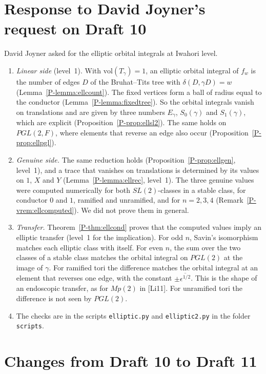 \documentclass[12pt,letterpaper]{amsart}
\begin{document}
\section{Response to David Joyner's request on Draft 10}
\label{sec:d10request}

David Joyner asked for the elliptic orbital integrals at Iwahori level.

\begin{enumerate}[leftmargin=1.5em]
\item \emph{Linear side} (level~1). With $\mathrm{vol}(T_\gamma)=1$, an elliptic
orbital integral of $f_w$ is the number of edges $D$ of the
Bruhat--Tits tree with $\delta(D,\gamma D)=w$
(Lemma~\ref{P-lemma:ellcount}). The fixed vertices form a ball of
radius equal to the conductor (Lemma~\ref{P-lemma:fixedtree}). So the
orbital integrals vanish on translations and are given by three
numbers $E_\gamma$, $S_0(\gamma)$ and $S_1(\gamma)$, which are
explicit (Proposition~\ref{P-prop:ellsl2}). The same holds on
$PGL(2,F)$, where elements that reverse an edge also occur
(Proposition~\ref{P-prop:ellpgl}).
\item \emph{Genuine side.} The same reduction holds
(Proposition~\ref{P-prop:ellgen}, level~1), and a trace that vanishes on
translations is determined by its values on $1$, $X$ and $Y$
(Lemma~\ref{P-lemma:ellrec}, level~1). The three genuine values were
computed numerically for both $SL(2)$-classes in a stable class, for
conductor $0$ and $1$, ramified and unramified, and for $n=2,3,4$
(Remark~\ref{P-vrem:ellcomputed}). We did not prove them in general.
\item \emph{Transfer.} Theorem~\ref{P-thm:ellcond} proves that the
computed values imply an elliptic transfer (level~1 for the
implication). For odd $n$, Savin's isomorphism matches each elliptic
class with itself. For even $n$, the sum over the two classes of a
stable class matches the orbital integral on $PGL(2)$ at the image of
$\gamma$. For ramified tori the difference matches the orbital integral
at an element that reverses one edge, with the constant
$\pm\overline{\epsilon^{1/2}}$. This is the shape of an endoscopic
transfer, as for $Mp(2)$ in [Li11]. For unramified tori the difference is
not seen by $PGL(2)$.
\item The checks are in the scripts \texttt{elliptic.py} and
\texttt{elliptic2.py} in the folder \texttt{scripts}.
\end{enumerate}

\section{Changes from Draft 10 to Draft 11}
\label{sec:d10d11}
\end{document}

